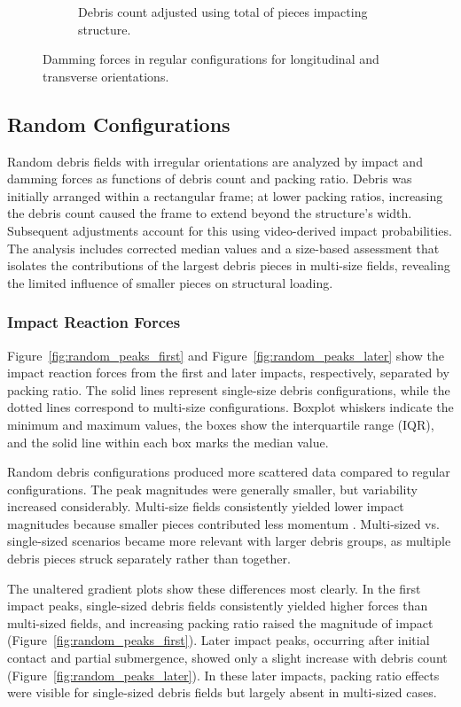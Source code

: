 \documentclass{article}
\begin{document}
{\begin{figure}[htbp]
\begin{subfigure}[t]{0.9\textwidth}
        \caption{Debris count adjusted using total of pieces impacting structure.}
        \label{fig:damming_regular_remap}
    \end{subfigure}
    \caption{Damming forces  in regular configurations for longitudinal and transverse orientations.}
    \label{fig:damming_regular_split}
\end{figure}

\subsection{Random Configurations}
Random debris fields with irregular orientations are analyzed by impact and damming forces as functions of debris count and packing ratio. Debris was initially arranged within a rectangular frame; at lower packing ratios, increasing the debris count caused the frame to extend beyond the structure’s width. Subsequent adjustments account for this using video-derived impact probabilities. The analysis includes corrected median values and a size-based assessment that isolates the contributions of the largest debris pieces in multi-size fields, revealing the limited influence of smaller pieces on structural loading.

\subsubsection{Impact Reaction Forces} 
Figure~\ref{fig:random_peaks_first} and Figure~\ref{fig:random_peaks_later} show the impact reaction forces from the first and later impacts, respectively, separated by packing ratio. The solid lines represent single-size debris configurations, while the dotted lines correspond to multi-size configurations. Boxplot whiskers indicate the minimum and maximum values, the boxes show the interquartile range (IQR), and the solid line within each box marks the median value.

Random debris configurations produced more scattered data compared to regular configurations. The peak magnitudes were generally smaller, but variability increased considerably. Multi-size fields consistently yielded lower impact magnitudes because smaller pieces contributed less momentum . Multi-sized vs. single-sized scenarios became more relevant with larger debris groups, as multiple debris pieces struck separately rather than together.

The unaltered gradient plots show these differences most clearly. In the first impact peaks, single-sized debris fields consistently yielded higher forces than multi-sized fields, and increasing packing ratio raised the magnitude of impact (Figure~\ref{fig:random_peaks_first}). Later impact peaks, occurring after initial contact and partial submergence, showed only a slight increase with debris count (Figure~\ref{fig:random_peaks_later}). In these later impacts, packing ratio effects were visible for single-sized debris fields but largely absent in multi-sized cases.

}
\end{document}
